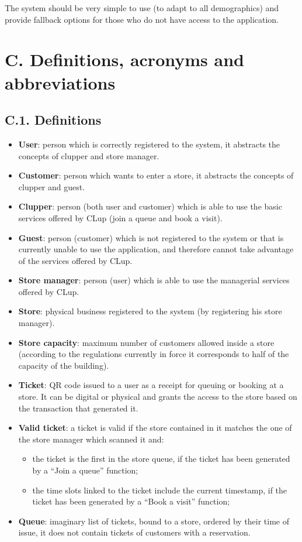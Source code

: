 The system should be very simple to use (to adapt to all demographics) and provide fallback options for those who do not have access to the application.

\section{C. Definitions, acronyms and abbreviations}

\subsection{C.1. Definitions}

\begin{itemize}
\item
  \textbf{User}: person which is correctly registered to the system, it abstracts the concepts of clupper and store manager.
\item
  \textbf{Customer}: person which wants to enter a store, it abstracts the concepts of clupper and guest.
\item
  \textbf{Clupper}: person (both user and customer) which is able to use the basic services offered by CLup (join a queue and book a visit).
\item
  \textbf{Guest}: person (customer) which is not registered to the system or that is currently unable to use the application, and therefore cannot take advantage of the services offered by CLup.
\item
  \textbf{Store manager}: person (user) which is able to use the managerial services offered by CLup.
\item
  \textbf{Store}: physical business registered to the system (by registering his store manager).
\item
  \textbf{Store capacity}: maximum number of customers allowed inside a store (according to the regulations currently in force it corresponds to half of the capacity of the building).
\item
  \textbf{Ticket}: QR code issued to a user as a receipt for queuing or booking at a store. It can be digital or physical and grants the access to the store based on the transaction that generated it.
\item
  \textbf{Valid ticket}: a ticket is valid if the store contained in it matches the one of the store manager which scanned it and:
  \begin{itemize}
  \tightlist
  \item
    the ticket is the first in the store queue, if the ticket has been generated by a ``Join a queue'' function;
  \item
    the time slots linked to the ticket include the current timestamp, if the ticket has been generated by a ``Book a visit'' function;
  \end{itemize}
\item
  \textbf{Queue}: imaginary list of tickets, bound to a store, ordered by their time of issue, it does not contain tickets of customers with a reservation.
\end{itemize}


